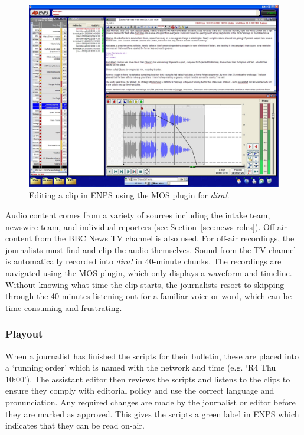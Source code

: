 \begin{figure}[ht]
  \centering
  \includegraphics[width=\columnwidth]{figs/news-enps-edit.jpg}
  \caption{Editing a clip in ENPS using the MOS plugin for \textit{dira!}.}
  \label{fig:news-enps-edit}
\end{figure}

Audio content comes from a variety of sources including the intake team,
newswire team, and individual reporters (see Section~\ref{sec:news-roles}).
Off-air content from the BBC News TV channel is also used.  For off-air
recordings, the journalists must find and clip the audio themselves. Sound from
the TV channel is automatically recorded into \textit{dira!} in 40-minute
chunks. The recordings are navigated using the MOS plugin, which only displays
a waveform and timeline. Without knowing what time the clip starts, the
journalists resort to skipping through the 40 minutes listening out for a
familiar voice or word, which can be time-consuming and frustrating.

\subsubsection{Playout}
When a journalist has finished the scripts for their bulletin, these are placed
into a `running order' which is named with the network and time (e.g. `R4 Thu
10:00'). The assistant editor then reviews the scripts and listens to the clips
to ensure they comply with editorial policy and use the correct language and 
pronunciation.  Any required changes are made by the journalist or
editor before they are marked as approved. This gives the scripts a green label
in ENPS which indicates that they can be read on-air.

